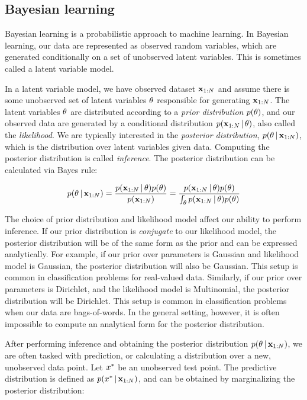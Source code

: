 \iffalse
\subsection{Bayesian learning}
Bayesian learning is a probabilistic
approach to machine learning.
In Bayesian learning, our data
are represented as observed random variables,
which are generated conditionally
on a set of unobserved latent variables.
This is sometimes called a latent variable model.

In a latent variable model,
we have observed dataset $\mathbf{x}_{1:N}$
and assume there is some
unobserved set of latent variables $\theta$
responsible for generating $\mathbf{x}_{1:N}$.
The latent variables $\theta$
are distributed according
to a \emph{prior distribution} $p(\theta)$,
and our observed data
are generated by a conditional
distribution $p(\mathbf{x}_{1:N} \,|\, \theta)$, also called
the \emph{likelihood}.
We are typically interested in the
\emph{posterior distribution},
$p(\theta \,|\, \mathbf{x}_{1:N})$, which is the distribution
over latent variables given data.
Computing the posterior distribution is called \emph{inference}.
The posterior distribution can be calculated
via Bayes rule:

\begin{align}
  p(\theta \,|\, \mathbf{x}_{1:N}) = \frac{p(\mathbf{x}_{1:N} \,|\, \theta)p(\theta)}{p(\mathbf{x}_{1:N})} = \frac{p(\mathbf{x}_{1:N} \,|\, \theta)p(\theta)}{\int_\theta p(\mathbf{x}_{1:N} \,|\, \theta)p(\theta)}
\end{align}

The choice of prior distribution and likelihood model
affect our ability to perform inference.
If our prior distribution is \emph{conjugate}
to our likelihood model, the posterior distribution
will be of the same form as the prior
and can be expressed analytically.
For example, if our prior over parameters
is Gaussian and likelihood model is Gaussian,
the posterior distribution will also be Gaussian.
This setup is common in classification problems
for real-valued data.
Similarly, if our prior over parameters is Dirichlet,
and the likelihood model is Multinomial,
the posterior distribution will be Dirichlet.
This setup is common in classification problems
when our data are bags-of-words.
In the general setting, however,
it is often impossible to compute an
analytical form for the posterior distribution.

After performing inference and obtaining
the posterior distribution $p(\theta \,|\, \mathbf{x}_{1:N})$,
we are often tasked with prediction,
or calculating a distribution over a new, unobserved
data point. Let $x^*$ be an unobserved test point.
The predictive distribution is defined
as $p(x^* \,|\, \mathbf{x}_{1:N})$, and can be obtained by
marginalizing the posterior distribution:

